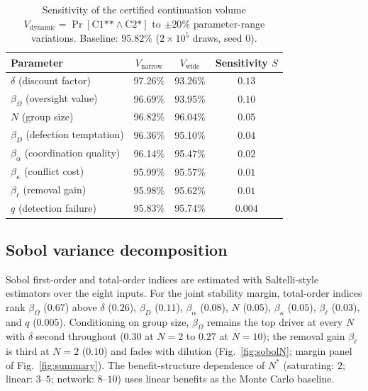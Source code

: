 \documentclass[manuscript,screen,review]{jair}
\begin{document}
\begin{table}
\caption{Sensitivity of the certified continuation volume $V_{\mathrm{dynamic}} = \Pr[\text{C1**} \land \text{C2*}]$ to $\pm 20\%$ parameter-range variations. Baseline: $95.82\%$ ($2\times 10^5$ draws, seed 0).}
\label{tab:range-sens}
\centering
\begin{tabular}{lccc}
\toprule
\textbf{Parameter} & $V_{\mathrm{narrow}}$ & $V_{\mathrm{wide}}$ & \textbf{Sensitivity } $S$ \\
\midrule
$\delta$ (discount factor) & 97.26\% & 93.26\% & $\mathbf{0.13}$ \\
$\beta_\Omega$ (oversight value) & 96.69\% & 93.95\% & $0.10$ \\
$N$ (group size) & 96.82\% & 96.04\% & $0.05$ \\
$\beta_D$ (defection temptation) & 96.36\% & 95.10\% & $0.04$ \\
$\beta_\alpha$ (coordination quality) & 96.14\% & 95.47\% & $0.02$ \\
$\beta_\kappa$ (conflict cost) & 95.99\% & 95.57\% & $0.01$ \\
$\beta_\ell$ (removal gain) & 95.98\% & 95.62\% & $0.01$ \\
$q$ (detection failure) & 95.83\% & 95.74\% & $0.004$ \\
\bottomrule
\end{tabular}
\end{table}

\subsection{Sobol variance decomposition}
Sobol first-order and total-order indices are estimated with Saltelli-style estimators \cite{saltelli.2002,sobol.1993} over the eight inputs. For the joint stability margin, total-order indices rank $\beta_\Omega$ ($0.67$) above $\delta$ ($0.26$), $\beta_D$ ($0.11$), $\beta_\alpha$ ($0.08$), $N$ ($0.05$), $\beta_\kappa$ ($0.05$), $\beta_\ell$ ($0.03$), and $q$ ($0.005$). Conditioning on group size, $\beta_\Omega$ remains the top driver at every $N$ with $\delta$ second throughout ($0.30$ at $N=2$ to $0.27$ at $N=10$); the removal gain $\beta_\ell$ is third at $N=2$ ($0.10$) and fades with dilution (Fig.~\ref{fig:sobolN}; margin panel of Fig.~\ref{fig:summary}). The benefit-structure dependence of $N^*$ (saturating: $2$; linear: $3$--$5$; network: $8$--$10$) uses linear benefits as the Monte Carlo baseline.
\end{document}
